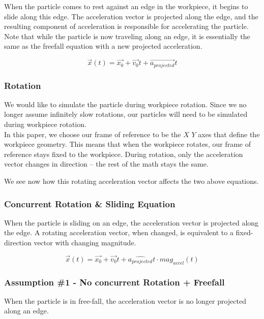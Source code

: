 When the particle comes to rest against an edge in the workpiece, it begins to slide along this edge. The acceleration vector is projected along the edge, and the resulting component of acceleration is responsible for accelerating the particle.
\\

Note that while the particle is now traveling along an edge, it is essentially the same as the freefall equation with a new projected acceleration.

$$
\vec{x}(t) = \vec{x_0} + \vec{v_0}t + \vec{a_{projected}}t
$$


		\subsubsection{Rotation}

We would like to simulate the particle during workpiece rotation. Since we no longer assume infinitely slow rotations, our particles will need to be simulated during workpiece rotation.
\\

In this paper, we choose our frame of reference to be the $X$ $Y$ axes that define the workpiece geometry. This means that when the workpiece rotates, our frame of reference stays fixed to the workpiece. During rotation, only the acceleration vector changes in direction -- the rest of the math stays the same.

We see now how this rotating acceleration vector affects the two above equations.

		\subsubsection{Concurrent Rotation \& Sliding Equation}

When the particle is sliding on an edge, the acceleration vector is projected along the edge. A rotating acceleration vector, when changed, is equivalent to a fixed-direction vector with changing magnitude.

$$
\vec{x}(t) = \vec{x_0} + \vec{v_0}t + \hat{a_{projected}}t \cdot mag_{accel}(t)
$$


		\subsubsection{Assumption \#1 - No concurrent Rotation + Freefall}

When the particle is in free-fall, the acceleration vector is no longer projected along an edge.

